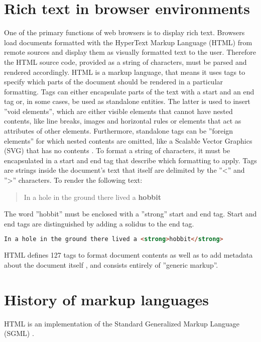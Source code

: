\section{Rich text in browser environments}

One of the primary functions of web browsers is to display rich text. Browsers load documents formatted with the HyperText Markup Language (HTML) from remote sources and display them as visually formatted text to the user.
Therefore the HTML source code, provided as a string of characters, must be parsed and rendered accordingly. HTML is a markup language, that means it uses tags to specify which parts of the document should be rendered in a particular formatting. Tags can either encapsulate parts of the text with a start and an end tag or, in some cases, be used as standalone entities. 
The latter is used to insert ''void elements'', which are either visible elements that cannot have nested contents, like line breaks, images and horizontal rules or elements that act as attributes of other elements. Furthermore, standalone tags can be ''foreign elements'' for which nested contents are omitted, like a Scalable Vector Graphics (SVG) that has no contents \cite[Elements]{HTML5}. 
To format a string of characters, it must be encapsulated in a start and end tag that describe which formatting to apply. Tags are strings inside the document's text that itself are delimited by the ''<'' and ''>'' characters. To render the following text: 

\begin{quotation}
In a hole in the ground there lived a \textbf{hobbit}
\end{quotation}

The word ''hobbit'' must be enclosed with a ''strong'' start and end tag. Start and end tags are distinguished by adding a solidus to the end tag.

\begin{lstlisting}[language=html, caption=Text formatted as bold with the ''strong'' tag, label=lst:div-contenteditable]
In a hole in the ground there lived a <strong>hobbit</strong>
\end{lstlisting}

HTML defines 127 tags to format document contents as well as to add metadata about the document itself \cite{mozel}, and consists entirely of ''generic markup''.



\section{History of markup languages}

HTML is an implementation of the Standard Generalized Markup Language (SGML) \cite{ISO8879}.